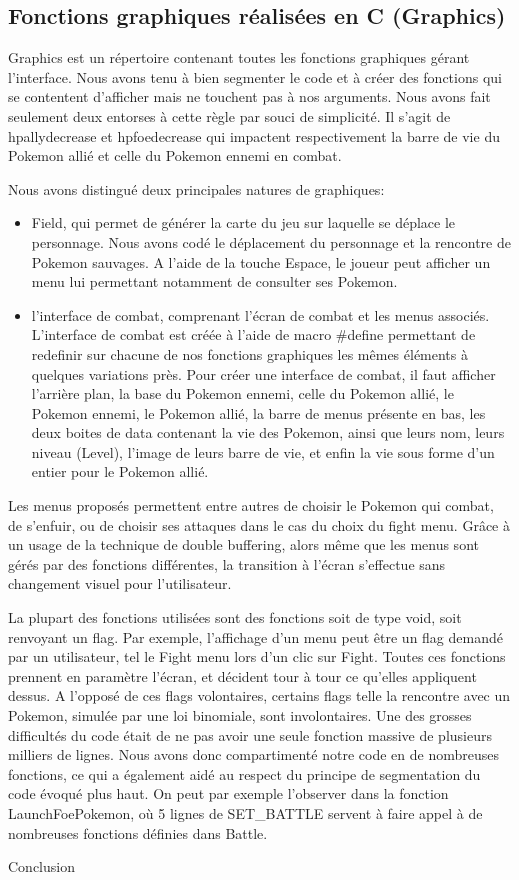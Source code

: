 \documentclass[a4paper,twoside, openany,11pt]{book}
\begin{document}
\subsection{Fonctions graphiques réalisées en C (Graphics)}


Graphics est un répertoire contenant toutes les fonctions graphiques gérant l'interface. Nous avons tenu à bien segmenter le code et à créer des fonctions qui se contentent d'afficher mais ne touchent pas à nos arguments. Nous avons fait seulement deux entorses à cette règle par souci de simplicité. Il s'agit de 
 hpallydecrease et hpfoedecrease qui impactent respectivement la barre de vie du Pokemon allié et celle du Pokemon ennemi en combat.
 
Nous avons distingué deux principales natures de graphiques:

\begin{itemize}
\item Field, qui permet de générer la carte du jeu sur laquelle se déplace le personnage. Nous avons codé le déplacement du personnage et la rencontre de Pokemon sauvages. A l'aide de la touche Espace, le joueur peut afficher un menu lui permettant notamment de consulter ses Pokemon.
\item l'interface de combat, comprenant l'écran de combat et les menus associés. L'interface de combat est créée à l'aide de macro \#define permettant de redefinir sur chacune de nos fonctions graphiques les mêmes éléments à quelques variations près. Pour créer une interface de combat, il faut afficher l'arrière plan, la base du Pokemon ennemi, celle du Pokemon allié, le Pokemon ennemi, le Pokemon allié, la barre de menus présente en bas, les deux boites de data contenant la vie des Pokemon, ainsi que leurs nom, leurs niveau (Level), l'image de leurs barre de vie, et enfin la vie sous forme d'un entier pour le Pokemon allié.
\end{itemize}

Les menus proposés permettent entre autres de choisir le Pokemon qui combat, de s'enfuir, ou de choisir ses attaques dans le cas du choix du fight menu. Grâce à un usage de la technique de double buffering, alors même que les menus sont gérés par des fonctions différentes, la transition à l'écran s'effectue sans changement visuel pour l'utilisateur.

La plupart des fonctions utilisées sont des fonctions soit de type void, soit renvoyant un flag. Par exemple, l'affichage d'un menu peut être un flag demandé par un utilisateur, tel le Fight menu lors d'un clic sur Fight. Toutes ces fonctions prennent en paramètre l'écran, et décident tour à tour ce qu'elles appliquent dessus. A l'opposé de ces flags volontaires, certains flags telle la rencontre avec un Pokemon, simulée par une loi binomiale, sont involontaires.
Une des grosses difficultés du code était de ne pas avoir une seule fonction massive de plusieurs milliers de lignes. Nous avons donc compartimenté notre code en de nombreuses fonctions, ce qui a également aidé au respect du principe de segmentation du code évoqué plus haut. On peut par exemple l'observer dans la fonction LaunchFoePokemon, où 5 lignes de SET\_BATTLE servent à faire appel à de nombreuses fonctions définies dans Battle.

\newpage
\pagestyle{empty}

{Conclusion}
\end{document}
